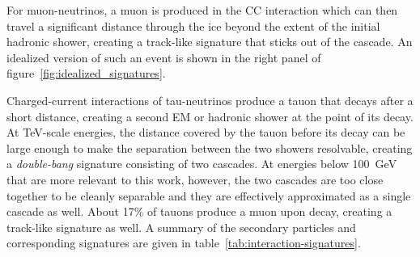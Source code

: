 For muon-neutrinos, a muon is produced in the CC interaction which can then travel a significant distance through the ice beyond the extent of the initial hadronic shower, creating a track-like signature that sticks out of the cascade. An idealized version of such an event is shown in the right panel of figure~\ref{fig:idealized_signatures}. 

Charged-current interactions of tau-neutrinos produce a tauon that decays after a short distance, creating a second EM or hadronic shower at the point of its decay. At TeV-scale energies, the distance covered by the tauon before its decay can be large enough to make the separation between the two showers resolvable, creating a \emph{double-bang} signature consisting of two cascades. At energies below 100~GeV that are more relevant to this work, however, the two cascades are too close together to be cleanly separable and they are effectively approximated as a single cascade as well. About 17\% of tauons produce a muon upon decay, creating a track-like signature as well. A summary of the secondary particles and corresponding signatures are given in table~\ref{tab:interaction-signatures}.

